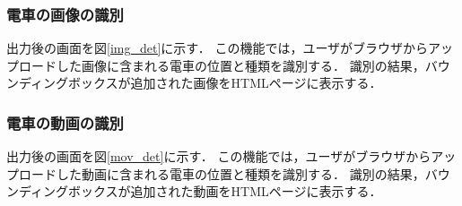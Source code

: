 \begin{multicols*}{2}
\subsubsection{電車の画像の識別}
出力後の画面を図\ref{img_det}に示す．
この機能では，ユーザがブラウザからアップロードした画像に含まれる電車の位置と種類を識別する．  識別の結果，バウンディングボックスが追加された画像をHTMLページに表示する．
\subsubsection{電車の動画の識別} 
出力後の画面を図\ref{mov_det}に示す．
この機能では，ユーザがブラウザからアップロードした動画に含まれる電車の位置と種類を識別する． 識別の結果，バウンディングボックスが追加された動画をHTMLページに表示する．



\end{multicols*}
